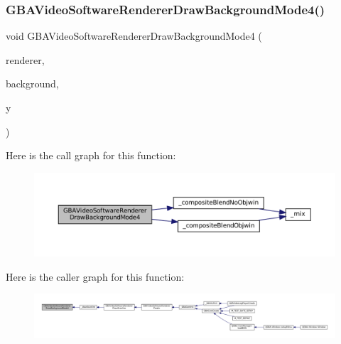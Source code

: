 \subsubsection{\texorpdfstring{G\+B\+A\+Video\+Software\+Renderer\+Draw\+Background\+Mode4()}{GBAVideoSoftwareRendererDrawBackgroundMode4()}}
{\footnotesize\ttfamily void G\+B\+A\+Video\+Software\+Renderer\+Draw\+Background\+Mode4 (\begin{DoxyParamCaption}\item[{struct G\+B\+A\+Video\+Software\+Renderer $\ast$}]{renderer,  }\item[{struct G\+B\+A\+Video\+Software\+Background $\ast$}]{background,  }\item[{\mbox{\hyperlink{ioapi_8h_a787fa3cf048117ba7123753c1e74fcd6}{int}}}]{y }\end{DoxyParamCaption})}

Here is the call graph for this function\+:
\nopagebreak
\begin{figure}[H]
\begin{center}
\leavevmode
\includegraphics[width=350pt]{software-private_8h_a0877e6bb6557f6b7069843bd995a3bce_cgraph}
\end{center}
\end{figure}
Here is the caller graph for this function\+:
\nopagebreak
\begin{figure}[H]
\begin{center}
\leavevmode
\includegraphics[width=350pt]{software-private_8h_a0877e6bb6557f6b7069843bd995a3bce_icgraph}
\end{center}
\end{figure}
\mbox{\label{software-private_8h_aa15bd912d55150946d944ab1ea4d457f}} 
